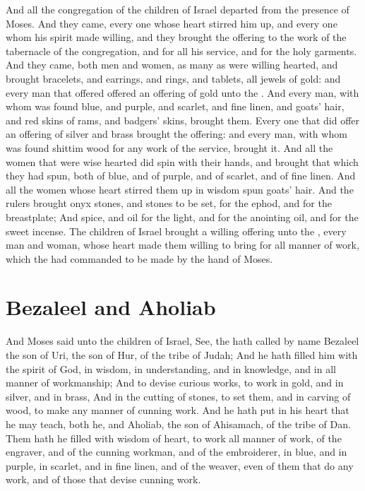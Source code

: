 \begin{biblechapter}
\verse And all the congregation of the children of Israel departed from the presence of Moses.
\verse And they came, every one whose heart stirred him up, and every one whom his spirit made willing, and they brought the \LORDs offering to the work of the tabernacle of the congregation, and for all his service, and for the holy garments.
\verse And they came, both men and women, as many as were willing hearted, and brought bracelets, and earrings, and rings, and tablets, all jewels of gold: and every man that offered offered an offering of gold unto the \LORD.
\verse And every man, with whom was found blue, and purple, and scarlet, and fine linen, and goats' hair, and red skins of rams, and badgers' skins, brought them.
\verse Every one that did offer an offering of silver and brass brought the \LORDs offering: and every man, with whom was found shittim wood for any work of the service, brought it.
\verse And all the women that were wise hearted did spin with their hands, and brought that which they had spun, both of blue, and of purple, and of scarlet, and of fine linen.
\verse And all the women whose heart stirred them up in wisdom spun goats' hair.
\verse And the rulers brought onyx stones, and stones to be set, for the ephod, and for the breastplate;
\verse And spice, and oil for the light, and for the anointing oil, and for the sweet incense.
\verse The children of Israel brought a willing offering unto the \LORD, every man and woman, whose heart made them willing to bring for all manner of work, which the \LORD had commanded to be made by the hand of Moses.
\section*{Bezaleel and Aholiab}
\verse And Moses said unto the children of Israel, See, the \LORD hath called by name Bezaleel the son of Uri, the son of Hur, of the tribe of Judah;
\verse And he hath filled him with the spirit of God, in wisdom, in understanding, and in knowledge, and in all manner of workmanship;
\verse And to devise curious works, to work in gold, and in silver, and in brass,
\verse And in the cutting of stones, to set them, and in carving of wood, to make any manner of cunning work.
\verse And he hath put in his heart that he may teach, both he, and Aholiab, the son of Ahisamach, of the tribe of Dan.
\verse Them hath he filled with wisdom of heart, to work all manner of work, of the engraver, and of the cunning workman, and of the embroiderer, in blue, and in purple, in scarlet, and in fine linen, and of the weaver, even of them that do any work, and of those that devise cunning work.
\end{biblechapter}

